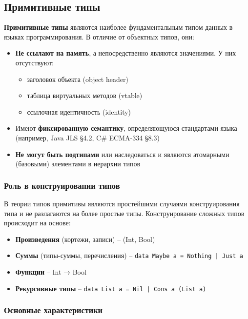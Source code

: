 \subsection{Примитивные типы}

\textbf{Примитивные типы} являются наиболее фундаментальным типом данных в языках программирования. В отличие от объектных типов, они:

\begin{itemize}
    \item \textbf{Не ссылают на память}, а непосредственно являются значениями. У них отсутствуют:
    \begin{itemize}
        \item заголовок объекта (object header)
        \item таблица виртуальных методов (vtable)
        \item ссылочная идентичность (identity)
    \end{itemize}
    \item Имеют \textbf{фиксированную семантику}, определяющуюся стандартами языка (например, Java JLS §4.2, C\# ECMA-334 §8.3)

    \item \textbf{Не могут быть подтипами} или наследоваться и являются атомарными (базовыми) элементами в иерархии типов
\end{itemize}

\subsubsection{Роль в конструировании типов}
В теории типов примитивы являются простейшими случаями конструирования типа и не разлагаются на более простые типы. Конструирование сложных типов происходит на основе:

\begin{itemize}
    \item \textbf{Произведения} (кортежи, записи) -- (Int, Bool)
    \item \textbf{Суммы} (типы-суммы, перечисления) -- \texttt{data Maybe a = Nothing | Just a}
    \item \textbf{Функции} -- Int → Bool
    \item \textbf{Рекурсивные типы} -- \texttt{data List a = Nil | Cons a (List a)}
\end{itemize}

\subsubsection{Основные характеристики}


